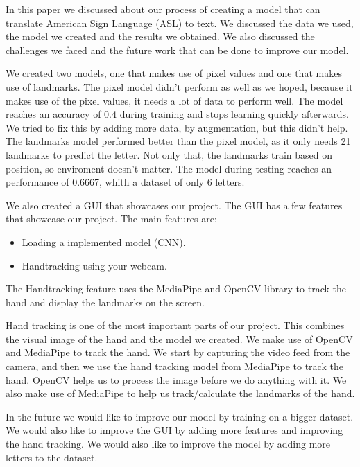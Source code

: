 \documentclass[../paper.tex]{subfiles}
\begin{document}
    In this paper we discussed about our process of creating a model that can translate American Sign Language (ASL) to text.
    We discussed the data we used, the model we created and the results we obtained.
    We also discussed the challenges we faced and the future work that can be done to improve our model.

    We created two models, one that makes use of pixel values and one that makes use of landmarks.
    The pixel model didn't perform as well as we hoped, because it makes use of the pixel values, it needs a lot of data to perform well.
    The model reaches an accuracy of 0.4 during training and stops learning quickly afterwards.
    We tried to fix this by adding more data, by augmentation, but this didn't help.
    The landmarks model performed better than the pixel model, as it only needs 21 landmarks to predict the letter.
    Not only that, the landmarks train based on position, so enviroment doesn't matter.
    The model during testing reaches an performance of 0.6667, whith a dataset of only 6 letters.

    We also created a GUI that showcases our project. The GUI has a few features that showcase our project. The main features are:
    \begin{itemize}
        \item Loading a implemented model (CNN).
        \item Handtracking using your webcam.
    \end{itemize}
    The Handtracking feature uses the MediaPipe and OpenCV library to track the hand and display the landmarks on the screen.

    Hand tracking is one of the most important parts of our project. 
    This combines the visual image of the hand and the model we created.
    We make use of OpenCV and MediaPipe to track the hand.
    We start by capturing the video feed from the camera, and then we use the hand tracking model from MediaPipe to track the hand.
    OpenCV helps us to process the image before we do anything with it.
    We also make use of MediaPipe to help us track/calculate the landmarks of the hand.

    In the future we would like to improve our model by training on a bigger dataset.
    We would also like to improve the GUI by adding more features and improving the hand tracking.
    We would also like to improve the model by adding more letters to the dataset.
\end{document}
